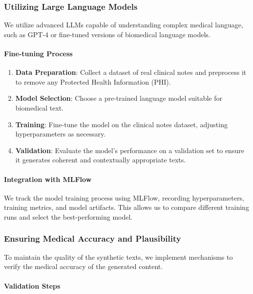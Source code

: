 \documentclass[12pt, a4paper]{article}
\begin{document}
\subsubsection{Utilizing Large Language Models}

We utilize advanced LLMs capable of understanding complex medical language, such as GPT-4 or fine-tuned versions of biomedical language models.

\paragraph{Fine-tuning Process}

\begin{enumerate}
    \item \textbf{Data Preparation}: Collect a dataset of real clinical notes and preprocess it to remove any Protected Health Information (PHI).
    \item \textbf{Model Selection}: Choose a pre-trained language model suitable for biomedical text.
    \item \textbf{Training}: Fine-tune the model on the clinical notes dataset, adjusting hyperparameters as necessary.
    \item \textbf{Validation}: Evaluate the model's performance on a validation set to ensure it generates coherent and contextually appropriate texts.
\end{enumerate}

\paragraph{Integration with MLFlow}

We track the model training process using MLFlow, recording hyperparameters, training metrics, and model artifacts. This allows us to compare different training runs and select the best-performing model.

\subsubsection{Ensuring Medical Accuracy and Plausibility}

To maintain the quality of the synthetic texts, we implement mechanisms to verify the medical accuracy of the generated content.

\paragraph{Validation Steps}
\end{document}
